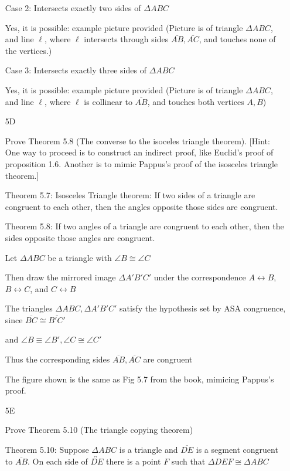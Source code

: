 \documentclass[11pt]{article}
\newcommand{\lines}[1]{\overleftrightarrow{#1}}
\newcommand{\segment}[1]{\overline{#1}}
\begin{document}
\begin{itemize}
		Case 2: Intersects exactly two sides of $\Delta ABC$

		Yes, it is possible: example picture provided (Picture is of triangle $\Delta ABC$, and line $\ell$, where $\ell$  intersects through sides $\segment{AB}, \segment{AC}$, and touches none of the vertices.)

		Case 3: Intersects exactly three sides of $\Delta ABC$

		Yes, it is possible: example picture provided (Picture is of triangle $\Delta ABC$, and line $\ell$, where $\ell$ is collinear to $\segment{AB}$, and touches both vertices $A,B$)

	\item[5D]

		Prove Theorem 5.8 (The converse to the isoceles triangle theorem). [Hint: One way to proceed is to construct an indirect proof, like Euclid's proof of proposition 1.6. Another is to mimic Pappus's proof of the isosceles triangle theorem.]

		Theorem 5.7: Isosceles Triangle theorem: If two sides of a triangle are congruent to each other, then the angles opposite those sides are congruent.

		Theorem 5.8: If two angles of a triangle are congruent to each other, then the sides opposite those angles are congruent.

		Let $\Delta ABC$ be a triangle with $\angle B \cong \angle C$

		Then draw the mirrored image $\Delta A' B' C'$ under the correspondence $A \leftrightarrow B$, $B \leftrightarrow C$, and $C \leftrightarrow B$

		The triangles $\Delta ABC, \Delta A'B'C'$ satisfy the hypothesis set by ASA congruence, since $\segment{BC} \cong \segment{B'C'}$

		and $\angle B \equiv \angle B', \angle C \cong \angle C'$

		Thus the corresponding sides $\segment{AB}, \segment{AC}$ are congruent

		The figure shown is the same as Fig 5.7 from the book, mimicing Pappus's proof. 

	\item[5E]

		Prove Theorem 5.10 (The triangle copying theorem)

		Theorem 5.10: Suppose $\Delta ABC$ is a triangle and $\segment{DE}$ is a segment congruent to $\segment{AB}$. On each side of $\lines{DE}$ there is a point $F$ such that $\Delta DEF \cong \Delta ABC$


\end{itemize}
\end{document}
